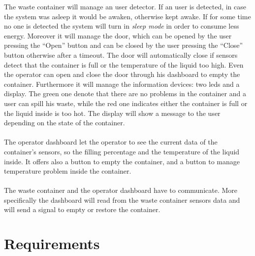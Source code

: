 \documentclass[a4paper,12pt]{report}
\begin{document}
        The waste container will manage an user detector. If an user is detected, in case the system was asleep it would be awaken, otherwise kept awake. If for some time no one is detected the system will turn in \textit{sleep mode} in order to consume less energy.
        Moreover it will manage the door, which can be opened by the user pressing the ``Open'' button and can be closed by the user pressing the ``Close'' button otherwise after a timeout. The door will automatically close if sensors detect that the container is full or the temperature of the liquid too high. 
        Even the operator can open and close the door through his dashboard to empty the container. 
        Furthermore it will manage the information devices: two leds and a display.
        The green one denote that there are no problems in the container and a user can spill his waste, while the red one indicates either the container is full or the liquid inside is too hot. 
        The display will show a message to the user depending on the state of the container.\\\\
        The operator dashboard let the operator to see the current data of the container's sensors, so the filling percentage and the temperature of the liquid inside. It offers also a button to empty the container, and a button to manage temperature problem inside the container.\\\\
        The waste container and the operator dashboard have to communicate. More specifically the dashboard will read from the waste container sensors data and will send a signal to empty or restore the container. 

    \section{Requirements}
\end{document}
